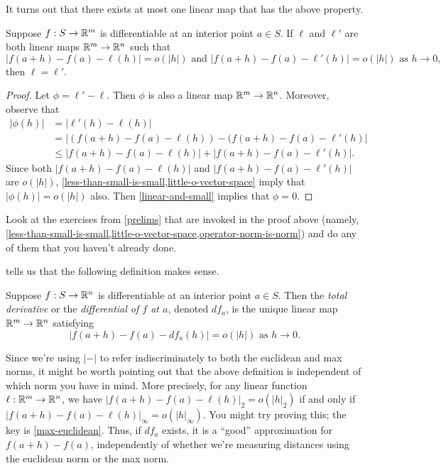 It turns out that there exists at most one linear map that has the above property. 

\begin{lemma} \label{differential-unique}
	Suppose $f : S \to \mathbb{R}^m$ is differentiable at an interior point $a \in S$. If $\ell$ and $\ell'$ are both linear maps $\mathbb{R}^m \to \mathbb{R}^n$ such that
	\[ |f(a+h) - f(a) - \ell(h)| = o(|h|) \text { and } |f(a+h) - f(a) - \ell'(h)| = o(|h|) \text{ as } h \to 0, \]
	then $\ell = \ell'$. 
\end{lemma}

\begin{proof}
	Let $\phi = \ell' - \ell$. Then $\phi$ is also a linear map $\mathbb{R}^m \to \mathbb{R}^n$. Moreover, observe that
	\[ \begin{aligned} |\phi(h)| &= |\ell'(h) - \ell(h)| \\
	&= |(f(a+h)-f(a)-\ell(h))-(f(a+h)-f(a)-\ell'(h)| \\
	&\leq |f(a+h)-f(a)-\ell(h)| + |f(a+h)-f(a)-\ell'(h)|. \end{aligned} \]
	Since both $|f(a+h)-f(a)-\ell(h)|$ and $|f(a+h)-f(a)-\ell'(h)|$ are $o(|h|)$, \cref{less-than-small-is-small,little-o-vector-space} imply that $|\phi(h)| = o(|h|)$ also. Then \cref{linear-and-small} implies that $\phi = 0$. 
\end{proof}

\begin{exercise}
	Look at the exercises from \cref{prelims} that are invoked in the proof above (namely, \cref{less-than-small-is-small,little-o-vector-space,operator-norm-is-norm}) and do any of them that you haven't already done.
\end{exercise}

 tells us that the following definition makes sense.  

\begin{definition} 
	Suppose $f : S \to \mathbb{R}^n$ is differentiable at an interior point $a \in S$. Then the \emph{total derivative} or the \emph{differential of $f$ at $a$}, denoted $df_a$, is the unique linear map $\mathbb{R}^m \to \mathbb{R}^n$ satisfying
	\[ |f(a+h)-f(a)-df_a(h)| = o(|h|) \text{ as } h \to 0.  \]
\end{definition}

\begin{pedanticremark}
	Since we're using $|-|$ to refer indiscriminately to both the euclidean and max norms, it might be worth pointing out that the above definition is independent of which norm you have in mind. More precisely, for any linear function $\ell : \mathbb{R}^m \to \mathbb{R}^n$, we have $|f(a+h)-f(a)-\ell(h)|_2 = o(|h|_2)$ if and only if $|f(a+h)-f(a)-\ell(h)|_\infty = o(|h|_\infty)$. You might try proving this; the key is \cref{max-euclidean}. Thus, if $df_a$ exists, it is a ``good'' approximation for $f(a+h)-f(a)$, independently of whether we're measuring distances using the euclidean norm or the max norm. 
\end{pedanticremark}

